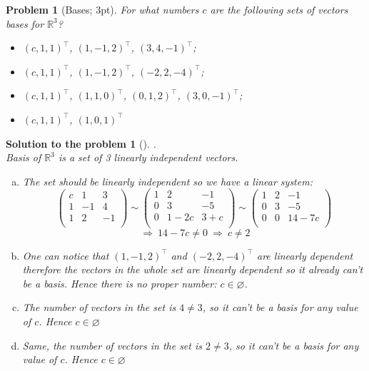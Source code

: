 \documentclass[12pt,a4]{article}
\newtheorem{problem}{Problem}
\newtheorem{solution}{Solution to the problem}
\newcommand{\bR}{{\mathbb R}}
\begin{document}
\begin{problem}[Bases; 3pt]\rm
	For what numbers $c$ are the following sets of vectors bases for $\bR^3$?
	\begin{itemize}
		\item[(a)] $(c,1,1)^\top$, $(1,-1,2)^\top$, $(3,4,-1)^\top$;
		\item[(b)] $(c,1,1)^\top$, $(1,-1,2)^\top$, $(-2,2,-4)^\top$;
		\item[(c)] $(c,1,1)^\top$, $(1,1,0)^\top$, $(0,1,2)^\top$, $(3,0,-1)^\top$;
		\item[(d)] $(c,1,1)^\top$, $(1,0,1)^\top$
	\end{itemize}
\end{problem}

\begin{solution}[]\rm .\\
Basis of $\bR^3$ is a set of 3 linearly independent vectors.
\begin{enumerate}[(a)]
\item The set should be linearly independent so we have a linear system:
\[
\begin{pmatrix}
c  & 1 & 3 \\
1  & -1 & 4 \\
1  & 2 & -1 \\
\end{pmatrix}
\sim
\begin{pmatrix}
1  & 2 & -1 \\
0  & 3 & -5 \\
0  & 1-2c & 3+c \\
\end{pmatrix}
\sim
\begin{pmatrix}
1  & 2 & -1 \\
0  & 3 & -5 \\
0  & 0 & 14-7c \\
\end{pmatrix}
\]
\[
~\Rightarrow ~14 - 7c \neq 0 ~\Rightarrow~ c \neq 2
\]
\item One can notice that $(1,-1,2)^\top$ and $(-2,2,-4)^\top$ are linearly dependent therefore the vectors in the whole set are linearly dependent so it already can't be a basis. Hence there is no proper number: $c \in  \varnothing $.
\item The number of vectors in the set is $4 \neq 3$, so it can't be a basis for any value of $c$. Hence $c \in \varnothing$
\item Same, the number of vectors in the set is $2 \neq 3$, so it can't be a basis for any value of $c$. Hence $c \in \varnothing$
\end{enumerate}
\end{solution}
\end{document}
